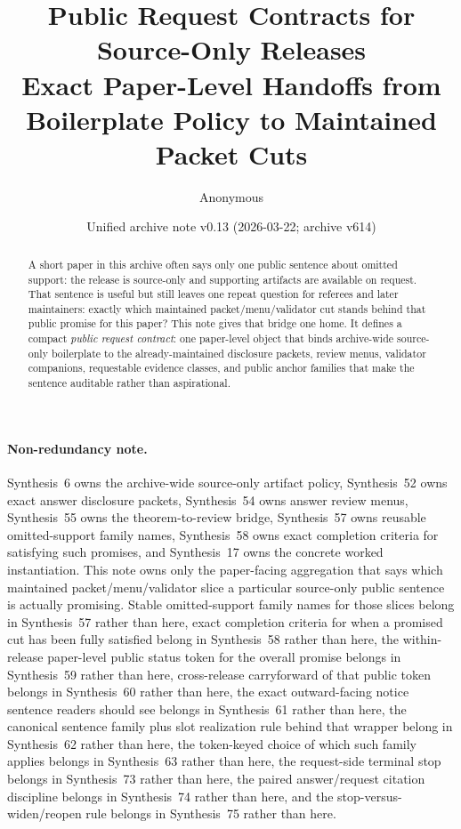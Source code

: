 \documentclass[11pt]{article}
\title{Public Request Contracts for Source-Only Releases\\\large Exact Paper-Level Handoffs from Boilerplate Policy to Maintained Packet Cuts}
\author{Anonymous}
\date{Unified archive note v0.13 (2026-03-22; archive v614)}
\begin{document}
\maketitle

\begin{abstract}
A short paper in this archive often says only one public sentence about omitted support: the release is source-only and supporting artifacts are available on request. That sentence is useful but still leaves one repeat question for referees and later maintainers: exactly which maintained packet/menu/validator cut stands behind that public promise for this paper? This note gives that bridge one home. It defines a compact \emph{public request contract}: one paper-level object that binds archive-wide source-only boilerplate to the already-maintained disclosure packets, review menus, validator companions, requestable evidence classes, and public anchor families that make the sentence auditable rather than aspirational.
\end{abstract}

\paragraph{Non-redundancy note.}
Synthesis~6 owns the archive-wide source-only artifact policy, Synthesis~52 owns exact answer disclosure packets, Synthesis~54 owns answer review menus, Synthesis~55 owns the theorem-to-review bridge, Synthesis~57 owns reusable omitted-support family names, Synthesis~58 owns exact completion criteria for satisfying such promises, and Synthesis~17 owns the concrete worked instantiation.\cite{series:artifactpolicy,series:challengeanswerdisclosurepackets,series:challengeanswerreviewmenus,series:seriesspines,series:requestableevidenceclasses,series:requestfulfillmentcertificates,series:workedexample}
This note owns only the paper-facing aggregation that says which maintained packet/menu/validator slice a particular source-only public sentence is actually promising. Stable omitted-support family names for those slices belong in Synthesis~57 rather than here, exact completion criteria for when a promised cut has been fully satisfied belong in Synthesis~58 rather than here, the within-release paper-level public status token for the overall promise belongs in Synthesis~59 rather than here, cross-release carryforward of that public token belongs in Synthesis~60 rather than here, the exact outward-facing notice sentence readers should see belongs in Synthesis~61 rather than here, the canonical sentence family plus slot realization rule behind that wrapper belong in Synthesis~62 rather than here, the token-keyed choice of which such family applies belongs in Synthesis~63 rather than here, the request-side terminal stop belongs in Synthesis~73 rather than here, the paired answer/request citation discipline belongs in Synthesis~74 rather than here, and the stop-versus-widen/reopen rule belongs in Synthesis~75 rather than here.
\end{document}
